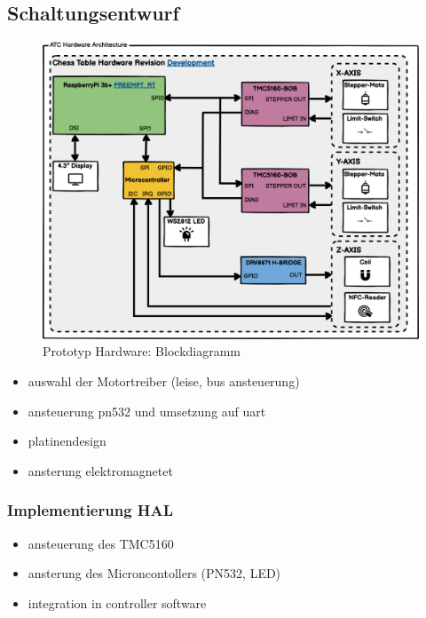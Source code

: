\hypertarget{schaltungsentwurf}{%
\subsection{Schaltungsentwurf}\label{schaltungsentwurf}}

\begin{figure}
\centering
\includegraphics{images/ATC_Hardware_Architecture_DK.png}
\caption{Prototyp Hardware: Blockdiagramm}
\end{figure}

\begin{itemize}
\tightlist
\item
  auswahl der Motortreiber (leise, bus ansteuerung)
\item
  ansteuerung pn532 und umsetzung auf uart
\item
  platinendesign
\item
  ansterung elektromagnetet
\end{itemize}

\hypertarget{implementierung-hal}{%
\subsubsection{Implementierung HAL}\label{implementierung-hal}}

\begin{itemize}
\tightlist
\item
  ansteuerung des TMC5160
\item
  ansterung des Microncontollers (PN532, LED)
\item
  integration in controller software
\end{itemize}

